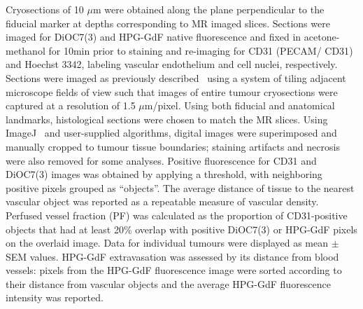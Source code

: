 Cryosections of 10 $\mu$m were obtained along the plane perpendicular to the fiducial marker at depths corresponding to MR imaged slices.
Sections were imaged for DiOC7(3) and \acs{HPG-GdF} native fluorescence and fixed in acetone-methanol for 10min prior to staining and re-imaging for \acs{CD31} (PECAM/ \acs{CD31}) and Hoechst 3342, labeling vascular endothelium and cell nuclei, respectively.
Sections were imaged as previously described~\cite{Kyle:2007ch} using a system of tiling adjacent microscope fields of view such that images of entire tumour cryosections were captured at a resolution of 1.5 $\mu$m/pixel.
Using both fiducial and anatomical landmarks, histological sections were chosen to match the MR slices.
Using ImageJ~\cite{Collins:2007jr} and user-supplied algorithms, digital images were superimposed and manually cropped to tumour tissue boundaries; staining artifacts and necrosis were also removed for some analyses.
Positive fluorescence for \acs{CD31} and DiOC7(3) images was obtained by applying a threshold, with neighboring positive pixels grouped as ``objects''.
The average distance of tissue to the nearest vascular object was reported as a repeatable measure of vascular density.
Perfused vessel fraction (PF) was calculated as the proportion of \acs{CD31}-positive objects that had at least 20\% overlap with positive DiOC7(3) or \acs{HPG-GdF} pixels on the overlaid image.
Data for individual tumours were displayed as mean $\pm$ SEM values.
HPG-GdF extravasation was assessed by its distance from blood vessels: pixels from the \acs{HPG-GdF} fluorescence image were sorted according to their distance from vascular objects and the average \acs{HPG-GdF} fluorescence intensity was reported.

